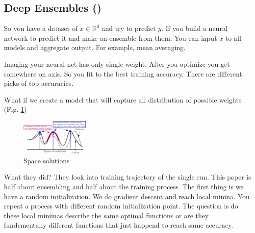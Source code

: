 \subsection{Deep Ensembles (\cite{fort2019ensemble})}

So you have a dataset of $x\in\mathbb{R}^d$ and try to predict $y$.
If you build a neural network to predict it and make an ensemble from them.
You can input $x$ to all models and aggregate output. For example, mean averaging.

Imaging your neural net has only single weight.
After you optimize you get somewhere on axis.
So you fit to the best training accuracy.
There are different picks of top accuracies.

What if we create a model that will capture all distribution of possible weights (Fig. \ref{fig:space_solutions})

\begin{figure}[h]
    \centering
    \includegraphics[width=0.3\textwidth]{images/space_solutions.png}
    \caption{Space solutions}
    \label{fig:space_solutions}
\end{figure}

What they did? They look into training trajectory of the single run.
This paper is half about ensembling and half about the training process.
The first thing is we have a random initialization. We do gradient descent and reach local minina.
You repeat a process with different random initialization point.
The question is do these local minimas describe the same optimal functions or are they fundementally different functions that just happend to reach same accuracy.

